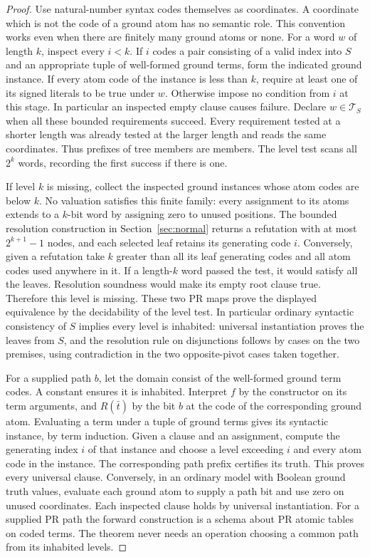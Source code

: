 \begin{proof}
Use natural-number syntax codes themselves as coordinates. A coordinate which is not the code of a ground atom has no semantic role. This convention works even when there are finitely many ground atoms or none. For a word $w$ of length $k$, inspect every $i<k$. If $i$ codes a pair consisting of a valid index into $S$ and an appropriate tuple of well-formed ground terms, form the indicated ground instance. If every atom code of the instance is less than $k$, require at least one of its signed literals to be true under $w$. Otherwise impose no condition from $i$ at this stage. In particular an inspected empty clause causes failure. Declare $w\in\mathcal T_S$ when all these bounded requirements succeed. Every requirement tested at a shorter length was already tested at the larger length and reads the same coordinates. Thus prefixes of tree members are members. The level test scans all $2^k$ words, recording the first success if there is one.

If level $k$ is missing, collect the inspected ground instances whose atom codes are below $k$. No valuation satisfies this finite family: every assignment to its atoms extends to a $k$-bit word by assigning zero to unused positions. The bounded resolution construction in Section~\ref{sec:normal} returns a refutation with at most $2^{k+1}-1$ nodes, and each selected leaf retains its generating code $i$. Conversely, given a refutation take $k$ greater than all its leaf generating codes and all atom codes used anywhere in it. If a length-$k$ word passed the test, it would satisfy all the leaves. Resolution soundness would make its empty root clause true. Therefore this level is missing. These two PR maps prove the displayed equivalence by the decidability of the level test. In particular ordinary syntactic consistency of $S$ implies every level is inhabited: universal instantiation proves the leaves from $S$, and the resolution rule on disjunctions follows by cases on the two premises, using contradiction in the two opposite-pivot cases taken together.

For a supplied path $b$, let the domain consist of the well-formed ground term codes. A constant ensures it is inhabited. Interpret $f$ by the constructor on its term arguments, and $R(\bar t)$ by the bit $b$ at the code of the corresponding ground atom. Evaluating a term under a tuple of ground terms gives its syntactic instance, by term induction. Given a clause and an assignment, compute the generating index $i$ of that instance and choose a level exceeding $i$ and every atom code in the instance. The corresponding path prefix certifies its truth. This proves every universal clause. Conversely, in an ordinary model with Boolean ground truth values, evaluate each ground atom to supply a path bit and use zero on unused coordinates. Each inspected clause holds by universal instantiation. For a supplied PR path the forward construction is a schema about PR atomic tables on coded terms. The theorem never needs an operation choosing a common path from its inhabited levels.


\end{proof}
